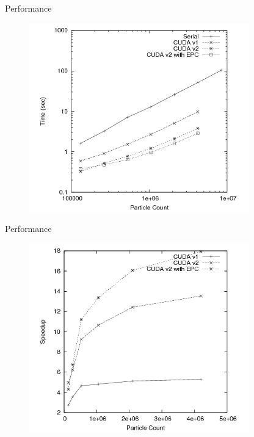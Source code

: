 \documentclass{beamer}
\begin{document}
\begin{frame}{Performance}

\begin{figure}
\centering
\includegraphics[width=0.85\textwidth]{data/timing_results.png}
\label{final_timing1}
\end{figure}

\end{frame}


\begin{frame}{Performance}

\begin{figure}
\centering
\includegraphics[width=0.85\textwidth]{data/timing_results_speedup.png}
\label{final_timing2}
\end{figure}

\end{frame}
\end{document}
